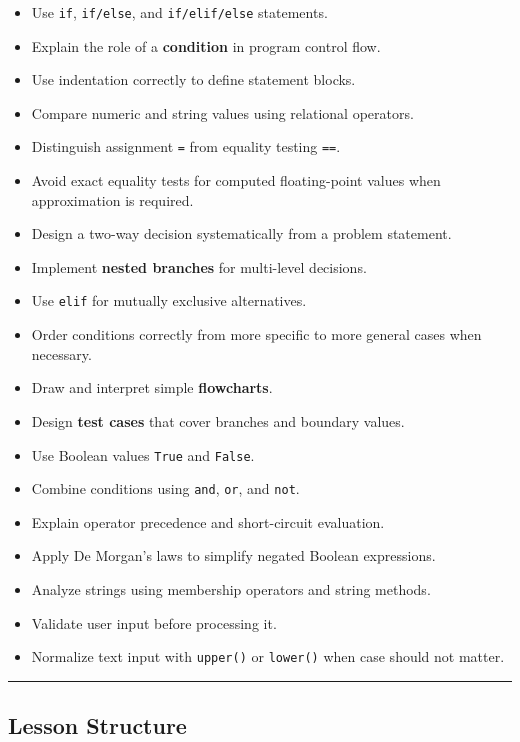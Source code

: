 \documentclass[
  11pt,
  a4paper,
]{article}
\providecommand{\tightlist}{%
  \setlength{\itemsep}{0pt}\setlength{\parskip}{0pt}}
\begin{document}
\begin{itemize}
\tightlist
\item
  Use \texttt{if}, \texttt{if/else}, and \texttt{if/elif/else}
  statements.
\item
  Explain the role of a \textbf{condition} in program control flow.
\item
  Use indentation correctly to define statement blocks.
\item
  Compare numeric and string values using relational operators.
\item
  Distinguish assignment \texttt{=} from equality testing \texttt{==}.
\item
  Avoid exact equality tests for computed floating-point values when
  approximation is required.
\item
  Design a two-way decision systematically from a problem statement.
\item
  Implement \textbf{nested branches} for multi-level decisions.
\item
  Use \texttt{elif} for mutually exclusive alternatives.
\item
  Order conditions correctly from more specific to more general cases
  when necessary.
\item
  Draw and interpret simple \textbf{flowcharts}.
\item
  Design \textbf{test cases} that cover branches and boundary values.
\item
  Use Boolean values \texttt{True} and \texttt{False}.
\item
  Combine conditions using \texttt{and}, \texttt{or}, and \texttt{not}.
\item
  Explain operator precedence and short-circuit evaluation.
\item
  Apply De Morgan's laws to simplify negated Boolean expressions.
\item
  Analyze strings using membership operators and string methods.
\item
  Validate user input before processing it.
\item
  Normalize text input with \texttt{upper()} or \texttt{lower()} when
  case should not matter.
\end{itemize}

\begin{center}\rule{0.5\linewidth}{0.5pt}\end{center}

\subsection{Lesson Structure}\label{lesson-structure}
\end{document}
